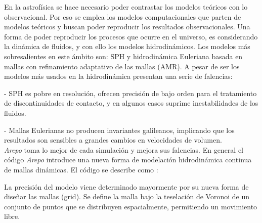 
En la astrofísica se hace necesario poder contrastar los modelos teóricos con lo observacional. Por eso se emplea los modelos computacionales que parten de  modelos teóricos y buscan poder reproducir los resultados observacionales. Una forma de poder reproducir los procesos que ocurre en el universo, es considerando la dinámica de fluidos, y con ello los modelos hidrodinámicos. Los modelos más sobresalientes en este ámbito son: SPH \cite{monaghan1992} y hidrodinámica Euleriana basada en mallas \cite{stone2008} con refinamiento adaptativo de las mallas (AMR). A pesar de ser los modelos más usados en la hidrodinámica presentan una serie de falencias:

- SPH es pobre en resolución,  ofrecen precisión de bajo orden para el tratamiento de discontinuidades de contacto, y en algunos casos suprime inestabilidades de los fluidos.

- Mallas Eulerianas no producen invariantes galileanos, implicando que los resultados son sensibles a grandes cambios en velocidades de volumen.\\

{\it{Arepo}} toma lo mejor de cada simulación y mejora sus falencias. En general el código {\it{Arepo}} \cite{springel2010} introduce una nueva forma de modelación hidrodinámica continua de mallas dinámicas. El código se describe como \cite{springel2010}:

La precisión del modelo viene determinado mayormente por su nueva forma de diseñar las mallas (grid). Se define la malla bajo la teselación de Voronoi de un conjunto de puntos que se distribuyen espacialmente, permitiendo un movimiento libre. 

